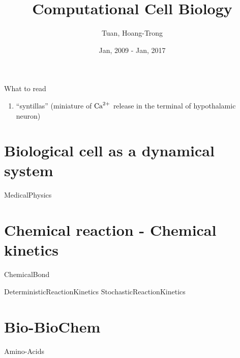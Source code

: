 \documentclass[11pt]{book}
\begin{document}


\author{Tuan, Hoang-Trong}
\title{Computational Cell Biology}
\date{Jan, 2009 - Jan, 2017}


\frontmatter
\tableofcontents
%

\mainmatter

What to read
\begin{enumerate}
  \item ``syntillas'' (miniature of ${\text{Ca}^{2+}}$ release in the
  terminal of hypothalamic neuron) \citep{crescenzo2004}
\end{enumerate}



\part{Biological cell as a dynamical system}





{MedicalPhysics}

\part{Chemical reaction - Chemical kinetics}
{ChemicalBond}

{DeterministicReactionKinetics}
{StochasticReactionKinetics}

\part{Bio-BioChem}

{Amino-Acids}




%



\end{document}
